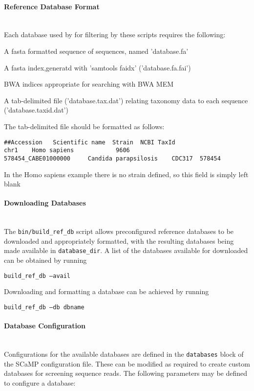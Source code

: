 \documentclass[a4paper,10pt]{article}
\newenvironment{tight_enumerate}{
\begin{enumerate}
  \setlength{\itemsep}{0pt}
  \setlength{\parskip}{0pt}
}{\end{enumerate}}
\newcommand{\para}[1]{\paragraph{#1}\mbox{}\\}
\begin{document}
\para{Reference Database Format}

Each database used by for filtering by these scripts requires the following:

\begin{tight_enumerate}
\item A fasta formatted sequence of sequences, named 'database.fa'
\item A fasta index,generatd with 'samtools faidx' ('database.fa.fai')
\item BWA indices appropriate for searching with BWA MEM 
\item A tab-delimited file ('database.tax.dat') relating taxonomy data to each sequence ('database.taxid.dat')
\end{tight_enumerate}

The tab-delimited file should be formatted as follows:

\begin{verbatim}
##Accession   Scientific name  Strain  NCBI TaxId
chr1    Homo sapiens            9606
578454_CABE01000000     Candida parapsilosis    CDC317  578454
\end{verbatim}

In the Homo sapiens example there is no strain defined, so this field is simply left blank

\para{Downloading Databases}

The {\tt bin/build\_ref\_db} script allows preconfigured reference databases to
be downloaded and appropriately formatted, with the resulting databases being
made available in {\tt database\_dir}. A list of the databases available for
downloaded can be obtained by running

{\tt build\_ref\_db --avail}

Downloading and formatting a database can be achieved by running

{\tt build\_ref\_db --db dbname}

\para{Database Configuration}

Configurations for the available databases are defined in the {\tt databases}
block of the SCaMP configuration file. These can be modified as required to
create custom databases for screening sequence reads. The following parameters
may be defined to configure a database:
\end{document}
